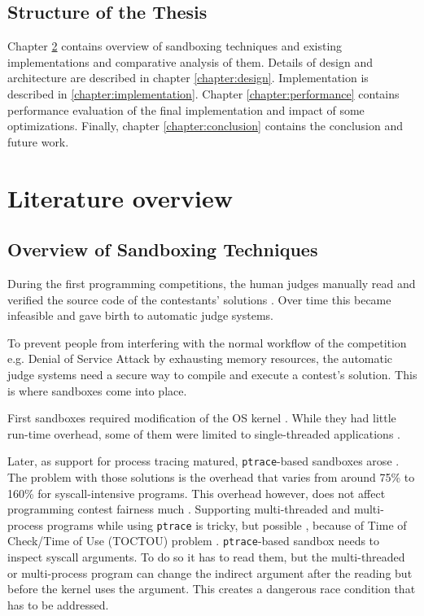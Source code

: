 \documentclass[en]{pracamgr}
\begin{document}
\section{Structure of the Thesis}

Chapter \ref{chapter:literature_overview} contains overview of sandboxing techniques and existing implementations and comparative analysis of them. Details of design and architecture are described in chapter \ref{chapter:design}. Implementation is described in \ref{chapter:implementation}. Chapter \ref{chapter:performance} contains performance evaluation of the final implementation and impact of some optimizations. Finally, chapter \ref{chapter:conclusion} contains the conclusion and future work.

\chapter{Literature overview}\label{chapter:literature_overview}

\section{Overview of Sandboxing Techniques}

During the first programming competitions, the human judges manually read and verified the source code of the contestants' solutions \cite{tochev2010validating}. Over time this became infeasible and gave birth to automatic judge systems.

To prevent people from interfering with the normal workflow of the competition e.g. Denial of Service Attack by exhausting memory resources, the automatic judge systems need a secure way to compile and execute a contest's solution. This is where sandboxes come into place.

First sandboxes required modification of the OS kernel \cite{provos2003improving, garfinkel2004janus, garfinkel2004ostia, jana2011txbox, li2014minibox}. While they had little run-time overhead, some of them were limited to single-threaded applications \cite{merry2009using}.

Later, as support for process tracing matured, \texttt{ptrace}-based sandboxes arose \cite{marevs2007perspectives, kolstad2009infrastructure, kim2013practical}. The problem with those solutions is the overhead that varies from around 75\% \cite{merry2010performance} to 160\% \cite{marevs2012new} for syscall-intensive programs. This overhead however, does not affect programming contest fairness much \cite{marevs2011fairness}. Supporting multi-threaded and multi-process programs while using \texttt{ptrace} is tricky, but possible \cite{kim2013practical}, because of Time of Check/Time of Use (TOCTOU) problem \cite{cwe_toctou}. \texttt{ptrace}-based sandbox needs to inspect syscall arguments. To do so it has to read them, but the multi-threaded or multi-process program can change the indirect argument after the reading but before the kernel uses the argument. This creates a dangerous race condition that has to be addressed.
\end{document}
